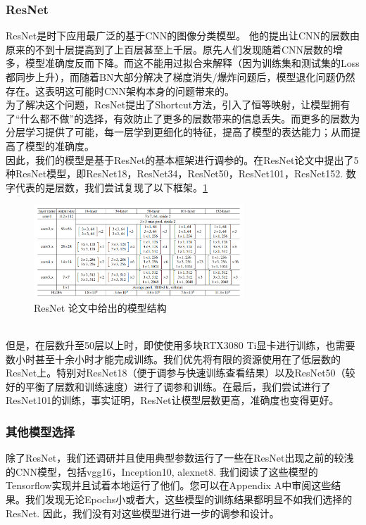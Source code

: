 \documentclass[hyperref, UTF8, 12pt]{article}
\theoremstyle{definition}
\begin{document}
\subsubsection{ResNet}
ResNet是时下应用最广泛的基于CNN的图像分类模型。\cite{he2015deep} 他的提出让CNN的层数由原来的不到十层提高到了上百层甚至上千层。原先人们发现随着CNN层数的增多，模型准确度反而下降。而这不能用过拟合来解释（因为训练集和测试集的Loss都同步上升），而随着BN大部分解决了梯度消失/爆炸问题后，模型退化问题仍然存在。这表明这可能时CNN架构本身的问题带来的。
\\ 
\indent
为了解决这个问题，ResNet提出了Shortcut方法，引入了恒等映射，让模型拥有了“什么都不做”的选择，有效防止了更多的层数带来的信息丢失。而更多的层数为分层学习提供了可能，每一层学到更细化的特征，提高了模型的表达能力；从而提高了模型的准确度。
\\ 
\indent
因此，我们的模型是基于ResNet的基本框架进行调参的。在ResNet论文\cite{he2015deep}中提出了5种ResNet模型，即ResNet18，ResNet34，ResNet50，ResNet101，ResNet152. 数字代表的是层数，我们尝试复现了以下框架。\ref{Fig.resnet1}
\begin{figure}[h] %
	\centering %
	\includegraphics[width=0.7\textwidth]{resnet.png} %
	\caption{ResNet 论文中给出的模型结构} %
	\label{Fig.resnet1} %
\end{figure}
\\
\indent
但是，在层数升至50层以上时，即使使用多块RTX3080 Ti显卡进行训练，也需要数小时甚至十余小时才能完成训练。我们优先将有限的资源使用在了低层数的ResNet上。特别对ResNet18（便于调参与快速训练查看结果）以及ResNet50（较好的平衡了层数和训练速度）进行了调参和训练。在最后，我们尝试进行了ResNet101的训练，事实证明，ResNet让模型层数更高，准确度也变得更好。
\\
\indent

\subsubsection{其他模型选择}
除了ResNet，我们还调研并且使用典型参数运行了一些在ResNet出现之前的较浅的CNN模型，包括vgg16，Inception10, alexnet8. 我们阅读了这些模型的Tensorflow实现并且试着本地运行了他们。您可以在Appendix A中审阅这些结果。我们发现无论Epochs小或者大，这些模型的训练结果都明显不如我们选择的ResNet. 因此，我们没有对这些模型进行进一步的调参和设计。
\end{document}
